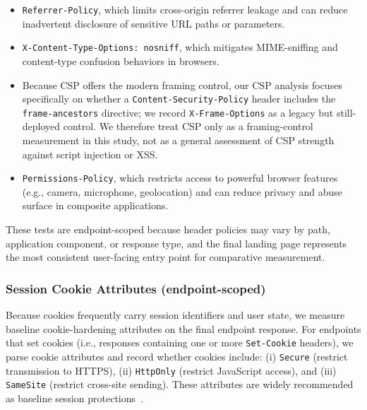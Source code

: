\documentclass[a4paper,fleqn]{cas-sc}
\begin{document}
    \begin{itemize}
    \item \texttt{Referrer-Policy}, which limits cross-origin referrer leakage and can reduce inadvertent disclosure of sensitive URL paths or parameters.
    \item \texttt{X-Content-Type-Options: nosniff}, which mitigates MIME-sniffing and content-type confusion behaviors in browsers.
    \item Because CSP offers the modern framing control, our CSP analysis focuses specifically on whether a \texttt{Content-Security-Policy} header includes the \texttt{frame-ancestors} directive; we record \texttt{X-Frame-Options} as a legacy but still-deployed control. We therefore treat CSP only as a framing-control measurement in this study, not as a general assessment of CSP strength against script injection or XSS.
    \item \texttt{Permissions-Policy}, which restricts access to powerful browser features (e.g., camera, microphone, geolocation) and can reduce privacy and abuse surface in composite applications.
    \end{itemize}
    These tests are endpoint-scoped because header policies may vary by path, application component, or response type, and the final landing page represents the most consistent user-facing entry point for comparative measurement.

\subsubsection{Session Cookie Attributes (endpoint-scoped)}\label{sec:cookies}
    Because cookies frequently carry session identifiers and user state, we measure baseline cookie-hardening attributes on the final endpoint response. 
    For endpoints that set cookies (i.e., responses containing one or more \texttt{Set-Cookie} headers), we parse cookie attributes and record whether cookies include: 
    (i) \texttt{Secure} (restrict transmission to HTTPS), (ii) \texttt{HttpOnly} (restrict JavaScript access), and (iii) \texttt{SameSite} (restrict cross-site sending). 
    These attributes are widely recommended as baseline session protections~\cite{mdn_secure_cookie_configuration,owasp_session_management_cookies}.
\end{document}
